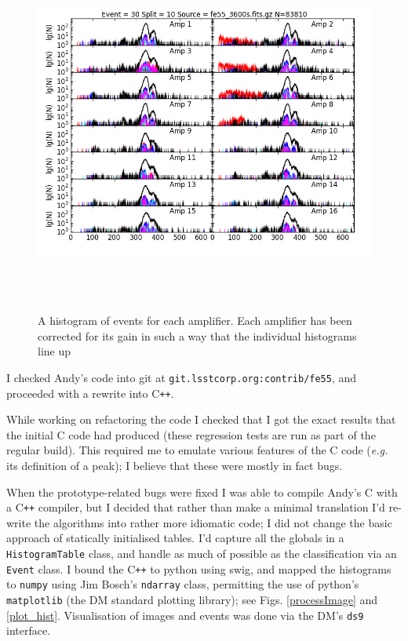 \documentclass[12pt]{article}
\newcommand{\CPP}{C\texttt{++}\xspace}  %
\begin{document}
\begin{figure}
  \hspace*{-10mm}\includegraphics[height=12cm]{fe55-gain-perAmp}
  \caption{A histogram of events for each amplifier.  Each amplifier has been corrected for its gain in
    such a way that the individual histograms line up
  }
  \label{eventsHistogramPerAmp}
\end{figure}

I checked Andy's code into git at \texttt{git\@git.lsstcorp.org:contrib/fe55}, and proceeded
with a rewrite into \CPP.

While working on refactoring the code I checked that I got the exact results that the initial C code had
produced (these regression tests are run as part of the regular build).  This required me to emulate various
features of the C code (\textit{e.g.} its definition of a peak); I believe that these were mostly in fact
bugs.

When the prototype-related bugs were fixed I was able to compile Andy's C with a \CPP compiler, but I decided
that rather than make a minimal translation I'd re-write the algorithms into rather more idiomatic code;
I did not change the basic approach of statically initialised tables.  I'd
capture all the globals in a \texttt{HistogramTable} class, and handle as much of possible as the
classification via an \texttt{Event} class.  I bound the \CPP to python using swig, and mapped the histograms
to \texttt{numpy} using Jim Bosch's \texttt{ndarray} class, permitting the use of python's \texttt{matplotlib}
(the DM standard plotting library); see Figs. \ref{processImage} and \ref{plot_hist}.  Visualisation of images
and events was done via the DM's \texttt{ds9} interface.
\end{document}
